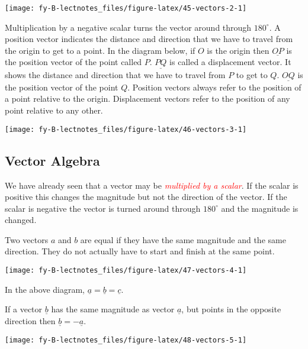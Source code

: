 \documentclass[
  11pt,
  oneside]{book}
\newcommand{\slide}{}
\theoremstyle{definition}
\theoremstyle{definition}
\theoremstyle{definition}
\theoremstyle{definition}
\theoremstyle{remark}
\begin{document}
\begin{center}\texttt{[image: fy-B-lectnotes\_files/figure-latex/45-vectors-2-1]} \end{center}

Multiplication by a negative scalar turns the vector around through \(180^\circ\). A position vector indicates the distance and direction that we have to travel from the origin to get to a point. In the diagram below, if \(O\) is the origin then \(\underline{OP}\) is the position vector of the point called \(P\). \(\underline{PQ}\) is called a displacement vector. It shows the distance and direction that we have to travel from \(P\) to get to \(Q\). \(\underline{OQ}\) is the position vector of the point \(Q\). Position vectors always refer to the position of a point relative to the origin. Displacement vectors refer to the position of any point relative to any other.

\begin{center}\texttt{[image: fy-B-lectnotes\_files/figure-latex/46-vectors-3-1]} \end{center}

\slide

\subsection{Vector Algebra}\label{vector-algebra}

We have already seen that a vector may be \textcolor{red}{\em multiplied by a scalar}. If the scalar is positive this changes the magnitude but not the direction of the vector. If the scalar is negative the vector is turned around through \(180^\circ\) and the magnitude is changed.

Two vectors \(a\) and \(b\) are equal if they have the same magnitude and the same direction. They do not actually have to start and finish at the same point.

\begin{center}\texttt{[image: fy-B-lectnotes\_files/figure-latex/47-vectors-4-1]} \end{center}

In the above diagram, \(\underline a= \underline b = \underline c\).

If a vector \(\underline b\) has the same magnitude as vector \(\underline a\), but points in the opposite direction then \(\underline b = -\underline a\).

\begin{center}\texttt{[image: fy-B-lectnotes\_files/figure-latex/48-vectors-5-1]} \end{center}
\end{document}
